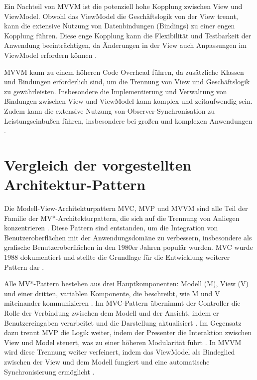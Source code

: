 Ein Nachteil von \ac{MVVM} ist die potenziell hohe Kopplung zwischen View und ViewModel. Obwohl das ViewModel die Geschäftslogik von der View trennt, kann die extensive Nutzung von Datenbindungen (Bindings) zu einer engen Kopplung führen. Diese enge Kopplung kann die Flexibilität und Testbarkeit der Anwendung beeinträchtigen, da Änderungen in der View auch Anpassungen im ViewModel erfordern können \cite{arcos2018comparative}.

\ac{MVVM} kann zu einem höheren Code Overhead führen, da zusätzliche Klassen und Bindungen erforderlich sind, um die Trennung von View und Geschäftslogik zu gewährleisten. Insbesondere die Implementierung und Verwaltung von Bindungen zwischen View und ViewModel kann komplex und zeitaufwendig sein. Zudem kann die extensive Nutzung von Observer-Synchronisation zu Leistungseinbußen führen, insbesondere bei großen und komplexen Anwendungen \cite{arcos2018comparative}.

\section{Vergleich der vorgestellten Architektur-Pattern}
Die Modell-View-Architekturpattern \ac{MVC}, \ac{MVP} und \ac{MVVM} sind alle Teil der Familie der MV*-Architekturpattern, die sich auf die Trennung von Anliegen konzentrieren \cite{aihara2012mvc}. Diese Pattern sind entstanden, um die Integration von Benutzeroberflächen mit der Anwendungsdomäne zu verbessern, insbesondere als grafische Benutzeroberflächen in den 1980er Jahren populär wurden. \ac{MVC} wurde 1988 dokumentiert und stellte die Grundlage für die Entwicklung weiterer Pattern dar \cite{aihara2012mvc}.

Alle MV*-Pattern bestehen aus drei Hauptkomponenten: Modell (M), View (V) und einer dritten, variablen Komponente, die beschreibt, wie M und V miteinander kommunizieren \cite{aihara2012mvc}. Im \ac{MVC}-Pattern übernimmt der Controller die Rolle der Verbindung zwischen dem Modell und der Ansicht, indem er Benutzereingaben verarbeitet und die Darstellung aktualisiert \cite{aihara2012mvc}. Im Gegensatz dazu trennt \ac{MVP} die Logik weiter, indem der Presenter die Interaktion zwischen View und Model steuert, was zu einer höheren Modularität führt \cite{aihara2012mvc}. In \ac{MVVM} wird diese Trennung weiter verfeinert, indem das ViewModel als Bindeglied zwischen der View und dem Modell fungiert und eine automatische Synchronisierung ermöglicht \cite{aihara2012mvc}.